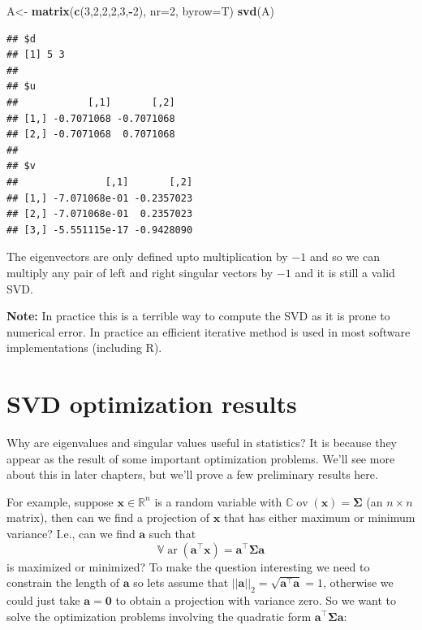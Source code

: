 \documentclass[
]{book}
\newenvironment{Shaded}{\begin{snugshade}}{\end{snugshade}}
\newcommand{\AttributeTok}[1]{\textcolor[rgb]{0.13,0.29,0.53}{#1}}
\newcommand{\DecValTok}[1]{\textcolor[rgb]{0.00,0.00,0.81}{#1}}
\newcommand{\FunctionTok}[1]{\textcolor[rgb]{0.13,0.29,0.53}{\textbf{#1}}}
\newcommand{\NormalTok}[1]{#1}
\newcommand{\OtherTok}[1]{\textcolor[rgb]{0.56,0.35,0.01}{#1}}
\newcommand{\SpecialCharTok}[1]{\textcolor[rgb]{0.81,0.36,0.00}{\textbf{#1}}}
\theoremstyle{definition}
\theoremstyle{definition}
\theoremstyle{definition}
\theoremstyle{definition}
\theoremstyle{remark}
\begin{document}
\begin{Shaded}
\begin{Highlighting}[]
\NormalTok{A}\OtherTok{\textless{}{-}} \FunctionTok{matrix}\NormalTok{(}\FunctionTok{c}\NormalTok{(}\DecValTok{3}\NormalTok{,}\DecValTok{2}\NormalTok{,}\DecValTok{2}\NormalTok{,}\DecValTok{2}\NormalTok{,}\DecValTok{3}\NormalTok{,}\SpecialCharTok{{-}}\DecValTok{2}\NormalTok{), }\AttributeTok{nr=}\DecValTok{2}\NormalTok{, }\AttributeTok{byrow=}\NormalTok{T)}
\FunctionTok{svd}\NormalTok{(A)}
\end{Highlighting}
\end{Shaded}

\begin{verbatim}
## $d
## [1] 5 3
## 
## $u
##            [,1]       [,2]
## [1,] -0.7071068 -0.7071068
## [2,] -0.7071068  0.7071068
## 
## $v
##               [,1]       [,2]
## [1,] -7.071068e-01 -0.2357023
## [2,] -7.071068e-01  0.2357023
## [3,] -5.551115e-17 -0.9428090
\end{verbatim}

The eigenvectors are only defined upto multiplication by \(-1\) and so we can multiply any pair of left and right singular vectors by \(-1\) and it is still a valid SVD.

\textbf{Note:} In practice this is a terrible way to compute the SVD as it is prone to numerical error. In practice an efficient iterative method is used in most software implementations (including R).

\hypertarget{svdopt}{%
\section{SVD optimization results}\label{svdopt}}

Why are eigenvalues and singular values useful in statistics? It is because they appear as the result of some important optimization problems. We'll see more about this in later chapters, but we'll prove a few preliminary results here.

For example, suppose \(\mathbf x\in\mathbb{R}^n\) is a random variable with \({\mathbb{C}\operatorname{ov}}(\mathbf x)=\boldsymbol{\Sigma}\) (an \(n \times n\) matrix), then can we find a projection of \(\mathbf x\) that has either maximum or minimum variance? I.e., can we find \(\mathbf a\) such that \[{\mathbb{V}\operatorname{ar}}(\mathbf a^\top\mathbf x)=\mathbf a^\top \boldsymbol{\Sigma}\mathbf a\] is maximized or minimized?
To make the question interesting we need to constrain the length of \(\mathbf a\) so lets assume that \(||\mathbf a||_2 = \sqrt{\mathbf a^\top \mathbf a}=1\), otherwise we could just take \(\mathbf a={\boldsymbol 0}\) to obtain a projection with variance zero. So we want to solve the optimization problems involving the quadratic form \(\mathbf a^\top \boldsymbol{\Sigma}\mathbf a\):
\end{document}
